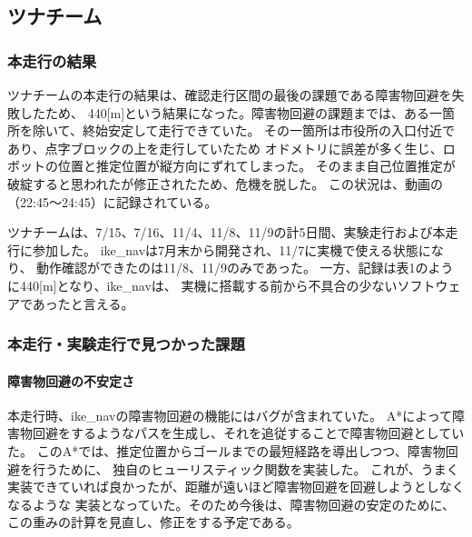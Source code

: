 \documentclass[twocolumn,9pt]{jsproceedings}
\begin{document}


\subsection{ツナチーム}
\subsubsection{本走行の結果}
ツナチームの本走行の結果は、確認走行区間の最後の課題である障害物回避を失敗したため、
440[m]という結果になった。障害物回避の課題までは、ある一箇所を除いて、終始安定して走行できていた。
その一箇所は市役所の入口付近であり、点字ブロックの上を走行していたため
オドメトリに誤差が多く生じ、ロボットの位置と推定位置が縦方向にずれてしまった。
そのまま自己位置推定が破綻すると思われたが修正されたため、危機を脱した。
この状況は、動画\cite{ike_nav_loc_youtube}の（22:45〜24:45）に記録されている。

ツナチームは、7/15、7/16、11/4、11/8、11/9の計5日間、実験走行および本走行に参加した。
ike\_navは7月末から開発され、11/7に実機で使える状態になり、
動作確認ができたのは11/8、11/9のみであった。
一方、記録は表1のように440[m]となり、ike\_navは、
実機に搭載する前から不具合の少ないソフトウェアであったと言える。

\subsubsection{本走行・実験走行で見つかった課題}
\paragraph{障害物回避の不安定さ}
本走行時、ike\_navの障害物回避の機能にはバグが含まれていた。
A*によって障害物回避をするようなパスを生成し、それを追従することで障害物回避としていた。
このA*では、推定位置からゴールまでの最短経路を導出しつつ、障害物回避を行うために、
独自のヒューリスティック関数を実装した。
これが、うまく実装できていれば良かったが、距離が遠いほど障害物回避を回避しようとしなくなるような
実装となっていた。そのため今後は、障害物回避の安定のために、この重みの計算を見直し、修正をする予定である。
\end{document}
